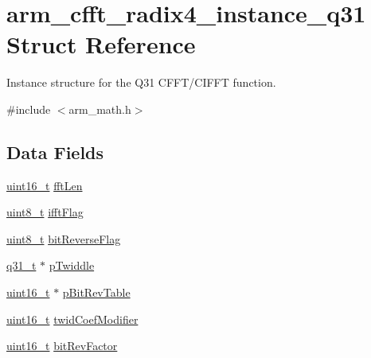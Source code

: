 \hypertarget{structarm__cfft__radix4__instance__q31}{\section{arm\-\_\-cfft\-\_\-radix4\-\_\-instance\-\_\-q31 Struct Reference}
\label{structarm__cfft__radix4__instance__q31}
}


Instance structure for the Q31 C\-F\-F\-T/\-C\-I\-F\-F\-T function.  




{\ttfamily \#include $<$arm\-\_\-math.\-h$>$}

\subsection*{Data Fields}
\begin{DoxyCompactItemize}
\item 
\hyperlink{stdint_8h_a273cf69d639a59973b6019625df33e30}{uint16\-\_\-t} \hyperlink{structarm__cfft__radix4__instance__q31_ab413d2a5d3f45fa187d93813bf3bf81b}{fft\-Len}
\item 
\hyperlink{stdint_8h_aba7bc1797add20fe3efdf37ced1182c5}{uint8\-\_\-t} \hyperlink{structarm__cfft__radix4__instance__q31_adc0a62ba669ad2282ecbe43d5d96abab}{ifft\-Flag}
\item 
\hyperlink{stdint_8h_aba7bc1797add20fe3efdf37ced1182c5}{uint8\-\_\-t} \hyperlink{structarm__cfft__radix4__instance__q31_a5a7c4f4c7b3fb655cbb2bc11ef160a2a}{bit\-Reverse\-Flag}
\item 
\hyperlink{arm__math_8h_adc89a3547f5324b7b3b95adec3806bc0}{q31\-\_\-t} $\ast$ \hyperlink{structarm__cfft__radix4__instance__q31_a561c22dee4cbdcfa0fd5f15106ecc306}{p\-Twiddle}
\item 
\hyperlink{stdint_8h_a273cf69d639a59973b6019625df33e30}{uint16\-\_\-t} $\ast$ \hyperlink{structarm__cfft__radix4__instance__q31_a33a3bc774c97373261699463c05dfe54}{p\-Bit\-Rev\-Table}
\item 
\hyperlink{stdint_8h_a273cf69d639a59973b6019625df33e30}{uint16\-\_\-t} \hyperlink{structarm__cfft__radix4__instance__q31_a8cf8187b8232815cf17ee82bf572ecf9}{twid\-Coef\-Modifier}
\item 
\hyperlink{stdint_8h_a273cf69d639a59973b6019625df33e30}{uint16\-\_\-t} \hyperlink{structarm__cfft__radix4__instance__q31_a94d2fead4efa4d5eaae142bbe30b0e15}{bit\-Rev\-Factor}
\end{DoxyCompactItemize}


